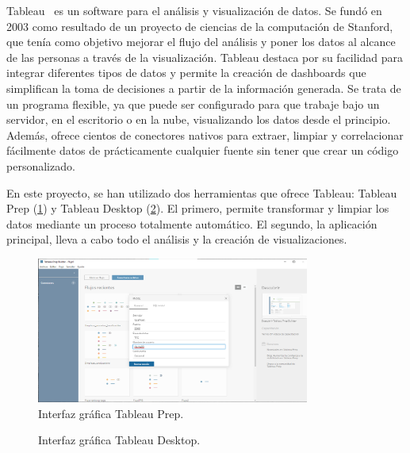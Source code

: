 \documentclass[a4paper, 12pt]{book}
\begin{document}
Tableau~\cite{Tableau} es un software para el análisis y visualización de datos. Se fundó en 2003 como resultado de un proyecto de ciencias de la computación de Stanford, que tenía como objetivo mejorar el flujo del análisis y poner los datos al alcance de las personas a través de la visualización.  
Tableau destaca por su facilidad para integrar diferentes tipos de datos y permite la creación de dashboards que simplifican la toma de decisiones a partir de la información generada. Se trata de un programa flexible, ya que puede ser configurado para que trabaje bajo un servidor, en el escritorio o en la nube, visualizando los datos desde el principio. Además, ofrece cientos de conectores nativos para extraer, limpiar y correlacionar fácilmente datos de prácticamente cualquier fuente sin tener que crear un código personalizado.

En este proyecto, se han utilizado dos herramientas que ofrece Tableau: Tableau Prep (\ref{figura:Tableau_Prep}) y Tableau Desktop (\ref{figura:Tableau_desktop}). El primero, permite transformar y limpiar los datos mediante un proceso totalmente automático. El segundo, la aplicación principal, lleva a cabo todo el análisis y la creación de visualizaciones. 

\begin{figure}[ht]
    \centering
        \includegraphics[width=0.8\textwidth]{img/PREP.png}
        \caption{Interfaz gráfica Tableau Prep.}
        \label{figura:Tableau_Prep}
    \end{figure}

\begin{figure}[ht]
 \centering
 \caption{Interfaz gráfica Tableau Desktop.}
 \label{figura:Tableau_desktop}
\end{figure}
    
\end{document}
